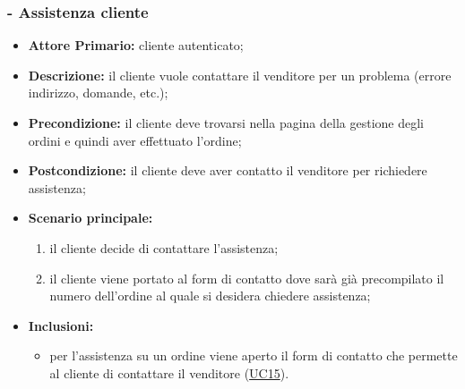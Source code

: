 \subsubsection{ - Assistenza cliente}
\begin{itemize}
\item \textbf{Attore Primario:} cliente autenticato;
\item \textbf{Descrizione:} il cliente vuole contattare il venditore per un problema (errore indirizzo, domande, etc.);
\item \textbf{Precondizione:} il cliente deve trovarsi nella pagina della gestione degli ordini e quindi aver effettuato l'ordine;
\item \textbf{Postcondizione:} il cliente deve aver contatto il venditore per richiedere assistenza;
\item \textbf{Scenario principale:}
\begin{enumerate}
    \item il cliente decide di contattare l'assistenza;
    \item il cliente viene portato al form di contatto dove sarà già precompilato il numero dell'ordine al quale si desidera chiedere assistenza;
\end{enumerate}
\item \textbf{Inclusioni:}
\begin{itemize}
    \item per l'assistenza su un ordine viene aperto il form di contatto che permette al cliente di contattare il venditore (\hyperref[UC15]{UC15}).
\end{itemize}
\end{itemize}

\stepsubUserCase
